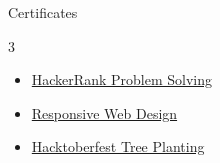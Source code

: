 \documentclass{resume} %
\begin{document}
\begin{rSection}{Certificates}
\begin{multicols}{3}
\begin{itemize}
  \item \href{https://www.hackerrank.com/certificates/73bb80c83be4}{HackerRank Problem Solving}
  \item \href{https://www.freecodecamp.org/certification/Roshan_kumar7989/responsive-web-design}{Responsive Web Design}
  \item \href{https://tree-nation.com/certificate/6525e97fbca2d}{Hacktoberfest Tree Planting}
\end{itemize}
\end{multicols}
\end{rSection}


\end{document}
